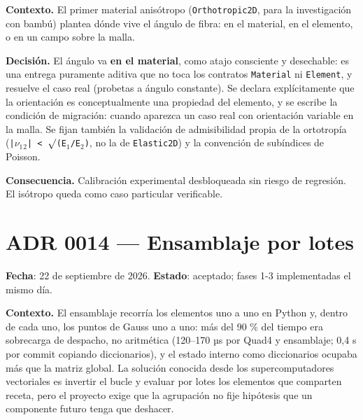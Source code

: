 \documentclass[11pt,oneside]{report}
\begin{document}
\textbf{Contexto.} El primer material anisótropo (\texttt{Orthotropic2D}, para la investigación con bambú) plantea dónde vive el ángulo de fibra: en el material, en el elemento, o en un campo sobre la malla.

\textbf{Decisión.} El ángulo va \textbf{en el material}, como atajo consciente y desechable: es una entrega puramente aditiva que no toca los contratos \texttt{Material} ni \texttt{Element}, y resuelve el caso real (probetas a ángulo constante). Se declara explícitamente que la orientación es conceptualmente una propiedad del elemento, y se escribe la condición de migración: cuando aparezca un caso real con orientación variable en la malla. Se fijan también la validación de admisibilidad propia de la ortotropía (\texttt{|\ensuremath{\nu}\ensuremath{_{1}}\ensuremath{_{2}}| \textless{} \ensuremath{\surd}(E\ensuremath{_{1}}/E\ensuremath{_{2}})}, no la de \texttt{Elastic2D}) y la convención de subíndices de Poisson.

\textbf{Consecuencia.} Calibración experimental desbloqueada sin riesgo de regresión. El isótropo queda como caso particular verificable.

\section{ADR 0014 --- Ensamblaje por lotes}
\label{adr:0014}

\textbf{Fecha}: 22 de septiembre de 2026. \textbf{Estado}: aceptado; fases 1-3 implementadas el mismo día.

\textbf{Contexto.} El ensamblaje recorría los elementos uno a uno en Python y, dentro de cada uno, los puntos de Gauss uno a uno: más del 90 \% del tiempo era sobrecarga de despacho, no aritmética (120--170 µs por Quad4 y ensamblaje; 0,4 s por commit copiando diccionarios), y el estado interno como diccionarios ocupaba más que la matriz global. La solución conocida desde los supercomputadores vectoriales es invertir el bucle y evaluar por lotes los elementos que comparten receta, pero el proyecto exige que la agrupación no fije hipótesis que un componente futuro tenga que deshacer.
\end{document}
